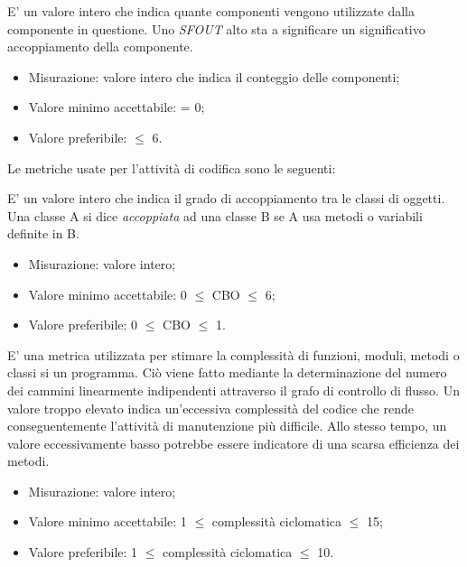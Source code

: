 			E' un valore intero che indica quante componenti vengono utilizzate dalla componente in questione. Uno \textit{SFOUT} alto sta a significare un significativo accoppiamento della componente.
		\begin{itemize}
			\item{Misurazione: valore intero che indica il conteggio delle componenti;}
			\item{Valore minimo accettabile: = 0;}
			\item{Valore preferibile: $\leq$ 6.}
		\end{itemize}
		
		Le metriche usate per l'attività di codifica sono le seguenti:
		
			E' un valore intero che indica il grado di accoppiamento tra le classi di oggetti. Una classe A si dice \textit{accoppiata} ad una classe B se A usa metodi o variabili definite in B.
		\begin{itemize}
			\item{Misurazione: valore intero;}
			\item{Valore minimo accettabile: 0 $\leq$ CBO $\leq$ 6;}
			\item{Valore preferibile: 0 $\leq$ CBO $\leq$ 1.}
		\end{itemize}
			
			E' una metrica utilizzata per stimare la complessità di funzioni, moduli, metodi o classi si un programma. Ciò viene fatto mediante la determinazione del numero dei cammini linearmente indipendenti attraverso il grafo di controllo di flusso. Un valore troppo elevato indica un'eccessiva complessità del codice che rende conseguentemente l'attività di manutenzione più difficile. Allo stesso tempo, un valore eccessivamente basso potrebbe essere indicatore di una scarsa efficienza dei metodi.
		\begin{itemize}
			\item{Misurazione: valore intero;}
			\item{Valore minimo accettabile: 1 $\leq$ complessità ciclomatica $\leq$ 15;}
			\item{Valore preferibile: 1 $\leq$ complessità ciclomatica $\leq$ 10.}
		\end{itemize}
			
